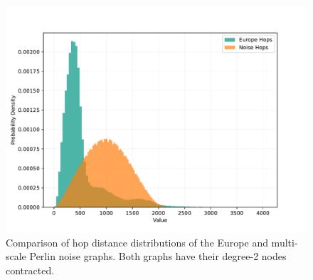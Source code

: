 \begin{figure}[tbhp]
    \centering
    \includegraphics[width=0.7\linewidth]{graphics/hop_compare_noise_europe.pdf}
    \caption{Comparison of hop distance distributions of the Europe and multi-scale Perlin noise graphs. Both graphs have their degree-2 nodes contracted.}
    \label{fig:hop_dist_comparison_noise_vs_europe}
\end{figure}
